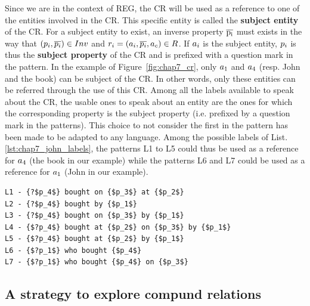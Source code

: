 Since we are in the context of REG, the CR will be used as a reference to one of the entities involved in the CR. This specific entity is called the \textbf{subject entity} of the CR. 
For a subject entity to exist, an inverse property $\overline{\rm p_i}$ must exists in the way that $(p_i, \overline{p_i}) \in Inv$ and $r_i = (a_i, \overline{p_i}, a_c) \in R$. If $a_i$ is the subject entity, $p_i$ is thus the \textbf{subject property} of the CR and is prefixed with a question mark in the pattern. In the example of Figure~\ref{fig:chap7_cr}, only $a_1$ and $a_4$ (resp. John and the book) can be subject of the CR. In other words, only these entities can be referred through the use of this CR. Among all the labels available to speak about the CR, the usable ones to speak about an entity are the ones for which the corresponding property is the subject property (i.e. prefixed by a question mark in the patterns). This choice to not consider the first in the pattern has been made to be adapted to any language. Among the possible labels of List.\ref{lst:chap7_john_labels}, the patterns L1 to L5 could thus be used as a reference for $a_4$ (the book in our example) while the patterns L6 and L7 could be used as a reference for $a_1$ (John in our example).

\begin{lstlisting}[frame=single, caption={ A part of the label set of the purchase compound relation.}, label={lst:chap7_john_labels}, captionpos=b, style=Labels, mathescape=true]
L1 - {?$p_4$} bought on {$p_3$} at {$p_2$}
L2 - {?$p_4$} bought by {$p_1$}
L3 - {?$p_4$} bought on {$p_3$} by {$p_1$}
L4 - {$?p_4$} bought at {$p_2$} on {$p_3$} by {$p_1$}
L5 - {$?p_4$} bought at {$p_2$} by {$p_1$}
L6 - {$?p_1$} who bought {$p_4$}
L7 - {$?p_1$} who bought {$p_4$} on {$p_3$}
\end{lstlisting}

\subsection{A strategy to explore compund relations}



